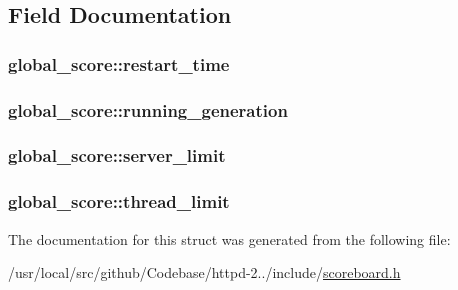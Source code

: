 \subsection{Field Documentation}
\subsubsection[{\texorpdfstring{restart\+\_\+time}{restart_time}}]{ global\+\_\+score\+::restart\+\_\+time}\hypertarget{structglobal__score_ace1aec17d7958881da29c9c2938bf238}{}\label{structglobal__score_ace1aec17d7958881da29c9c2938bf238}
\subsubsection[{\texorpdfstring{running\+\_\+generation}{running_generation}}]{ global\+\_\+score\+::running\+\_\+generation}\hypertarget{structglobal__score_a2d68d2a23841cbc2d727acf3ff1ad5d2}{}\label{structglobal__score_a2d68d2a23841cbc2d727acf3ff1ad5d2}
\subsubsection[{\texorpdfstring{server\+\_\+limit}{server_limit}}]{ global\+\_\+score\+::server\+\_\+limit}\hypertarget{structglobal__score_ac28d7a957e390b94f4fd2bc6f2c6366c}{}\label{structglobal__score_ac28d7a957e390b94f4fd2bc6f2c6366c}
\subsubsection[{\texorpdfstring{thread\+\_\+limit}{thread_limit}}]{ global\+\_\+score\+::thread\+\_\+limit}\hypertarget{structglobal__score_a76757ac2287bc3380260b86de6ab8ef4}{}\label{structglobal__score_a76757ac2287bc3380260b86de6ab8ef4}


The documentation for this struct was generated from the following file\+:\begin{DoxyCompactItemize}
\item 
/usr/local/src/github/\+Codebase/httpd-\/2../include/\hyperlink{scoreboard_8h}{scoreboard.\+h}\end{DoxyCompactItemize}
